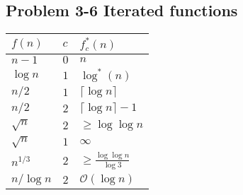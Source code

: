 \subsection*{Problem 3-6 Iterated functions}
\begin{lrbox}{\tablebox}
	\begin{tabular}{ l  l | l |}
		$f(n)$ & $c$ & $f^*_c(n)$ \\\hline
		$n - 1$ & $0$ & $n$ \\\hline
		$\log n$ & $1$ & $\log^*(n)$ \\\hline
		$n / 2$ & $1$ & $\lceil \log n \rceil$ \\\hline
		$n / 2$ & $2$ & $\lceil \log n \rceil - 1$ \\\hline
		$\sqrt{n}$ & $2$ & $\geq \log{\log n}$ \\\hline
		$\sqrt{n}$ & $1$ & $\infty$ \\\hline
		$n^{1/3}$ & $2$ & $\geq \frac{\log{\log n}}{\log 3}$ \\\hline
		$n/\log n$ & $2$ & $\mathcal{O}(\log n)$ \\\hline
		
	\end{tabular}
\end{lrbox}


\begin{center}
\resizebox{0.4\textwidth}{!}{\usebox{\tablebox}}
\end{center}

